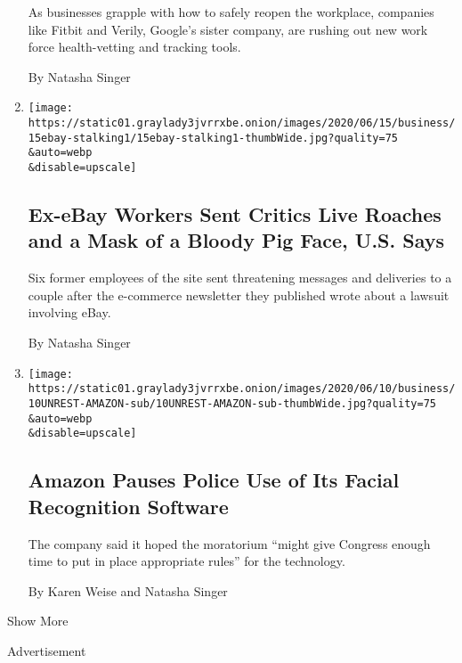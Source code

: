 \begin{enumerate}
  As businesses grapple with how to safely reopen the workplace,
  companies like Fitbit and Verily, Google's sister company, are rushing
  out new work force health-vetting and tracking tools.

  By Natasha Singer
\item
  \href{/2020/06/15/technology/ebay-cyberstalking-with-cockroaches-and-bloody-pig-face.html}{}

  \texttt{[image: https://static01.graylady3jvrrxbe.onion/images/2020/06/15/business/15ebay-stalking1/15ebay-stalking1-thumbWide.jpg?quality=75\\\&auto=webp\\\&disable=upscale]}

  \hypertarget{ex-ebay-workers-sent-critics-live-roaches-and-a-mask-of-a-bloody-pig-face-us-says}{%
  \subsection{Ex-eBay Workers Sent Critics Live Roaches and a Mask of a
  Bloody Pig Face, U.S.
  Says}\label{ex-ebay-workers-sent-critics-live-roaches-and-a-mask-of-a-bloody-pig-face-us-says}}

  Six former employees of the site sent threatening messages and
  deliveries to a couple after the e-commerce newsletter they published
  wrote about a lawsuit involving eBay.

  By Natasha Singer
\item
  \href{/2020/06/10/technology/amazon-facial-recognition-backlash.html}{}

  \texttt{[image: https://static01.graylady3jvrrxbe.onion/images/2020/06/10/business/10UNREST-AMAZON-sub/10UNREST-AMAZON-sub-thumbWide.jpg?quality=75\\\&auto=webp\\\&disable=upscale]}

  \hypertarget{amazon-pauses-police-use-of-its-facial-recognition-software}{%
  \subsection{Amazon Pauses Police Use of Its Facial Recognition
  Software}\label{amazon-pauses-police-use-of-its-facial-recognition-software}}

  The company said it hoped the moratorium ``might give Congress enough
  time to put in place appropriate rules'' for the technology.

  By Karen Weise and Natasha Singer
\end{enumerate}

Show More

Advertisement

